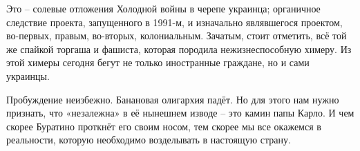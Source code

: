 Это – солевые отложения Холодной войны в черепе украинца; органичное следствие
проекта, запущенного в 1991-м, и изначально являвшегося проектом, во-первых,
правым, во-вторых, колониальным. Зачатым, стоит отметить, всё той же спайкой
торгаша и фашиста, которая породила нежизнеспособную химеру. Из этой химеры
сегодня бегут не только иностранные граждане, но и сами украинцы.             

Пробуждение неизбежно. Банановая олигархия падёт. Но для этого нам нужно
признать, что «незалежна» в её нынешнем изводе – это камин папы Карло. И чем
скорее Буратино проткнёт его своим носом, тем скорее мы все окажемся в
реальности, которую необходимо возделывать в настоящую страну.

